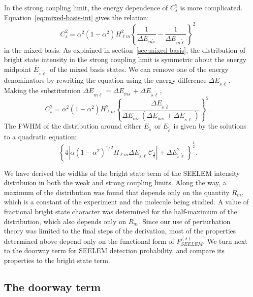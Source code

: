 \documentclass[12pt]{mitthesis}
\newcommand{\ts}{\tilde{s}\,}
\newcommand{\tl}{\tilde{\ell}\,}
\begin{document}
In the strong coupling limit, the energy dependence of $C_s^2$ is more
complicated. Equation~\ref{eq:mixed-basis-int} gives the relation:
\begin{equation}
  C_s^2 = \alpha^2 (1-\alpha^2)H_{\ell m}^2
  \left \lbrace
    \frac{1}{\Delta E_{m \ts}} -
    \frac{1}{\Delta E_{m \tl}}
  \right \rbrace^2
\end{equation}
in the mixed basis.  As explained in section~\ref{sec:mixed-basis},
the distribution of bright state intensity in the strong coupling
limit is symmetric about the energy midpoint $\bar{E}_{\ts \tl}$ of
the mixed basis states.  We can remove one of the energy denominators
by rewriting the equation using the energy difference $\Delta E_{\ts
  \tl}$.  Making the substitutuion $\Delta E_{m \tl} = \Delta E_{m
  \ts} + \Delta E_{\ts \tl}$,
\begin{equation}
  C_s^2 = \alpha^2 (1-\alpha^2)H_{\ell m}^2
  \left \lbrace
    \frac{\Delta E_{\ts \tl}}
    {\Delta E_{m \ts}(\Delta E_{m \ts} + \Delta E_{\ts \tl})}
  \right \rbrace^2.
\end{equation}
The FWHM of the distribution around either $E_{\ts}$ or $E_{\tl}$ is
given by the solutions to a quadratic equation:
\begin{equation}
  \left \lbrace
    4 \left \lvert
      \alpha (1-\alpha^2)^{1/2}H_{\ell m} \Delta E_{\ts \tl} 
      \mathcal{C}_{\frac{1}{2}}
      \right \rvert + \Delta E_{\ts \tl}^2
  \right \rbrace^{\frac{1}{2}}.
\end{equation}

We have derived the widths of the bright state term of the SEELEM
intensity distribuion in both the weak and strong coupling limits.
Along the way, a maximum of the distribution was found that depends
only on the quantity $R_m$, which is a constant of the experiment and
the molecule being studied.  A value of fractional bright state
character was determined for the half-maximum of the distribution,
which also depends only on $R_m$.  Since our use of perturbation
theory was limited to the final steps of the derivation, most of the
properties determined above depend only on the functional form of
$P_{SEELEM}^{(s)}$.  We turn next to the doorway term for SEELEM
detection probability, and compare its properties to the bright state
term.

\subsection{The doorway term}
\end{document}
